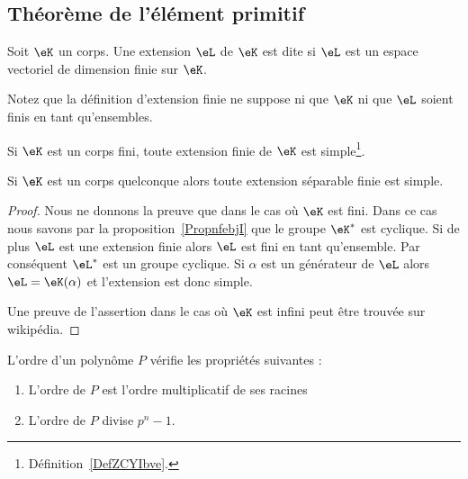 \subsection{Théorème de l'élément primitif}

\begin{definition}
    Soit \( \eK\) un corps. Une extension \( \eL\) de \( \eK\) est dite  si \( \eL\) est un espace vectoriel de dimension finie sur \( \eK\).
\end{definition}
Notez que la définition d'extension finie ne suppose ni que \( \eK\) ni que \( \eL\) soient finis en tant qu'ensembles.

\begin{theorem}
    Si \( \eK\) est un corps fini, toute extension finie de \( \eK\) est simple\footnote{Définition~\ref{DefZCYIbve}.}.

    Si \( \eK\) est un corps quelconque alors toute extension séparable finie est simple.
\end{theorem}

\begin{proof}
    Nous ne donnons la preuve que dans le cas où \( \eK\) est fini. Dans ce cas nous savons par la proposition~\ref{PropnfebjI} que le groupe \( \eK^*\) est cyclique. Si de plus \( \eL\) est une extension finie alors \( \eL\) est fini en tant qu'ensemble. Par conséquent \( \eL^*\) est un groupe cyclique. Si \( \alpha\) est un générateur de \( \eL\) alors \( \eL=\eK(\alpha)\) et l'extension est donc simple.

    Une preuve de l'assertion dans le cas où \( \eK\) est infini peut être trouvée sur wikipédia.
\end{proof}

\begin{proposition}
    L'ordre d'un polynôme \( P\) vérifie les propriétés suivantes :
    \begin{enumerate}
        \item
            L'ordre de \( P\) est l'ordre multiplicatif de ses racines
        \item
            L'ordre de \( P\) divise \( p^n-1\).
    \end{enumerate}
\end{proposition}


